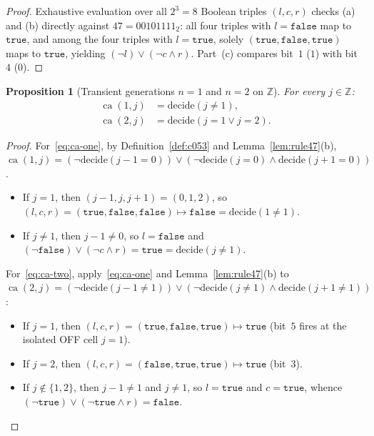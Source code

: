 \documentclass[11pt]{article}
\newtheorem{proposition}[theorem]{Proposition}
\theoremstyle{definition}
\newcommand{\Z}{\mathbb{Z}}
\newcommand{\ca}{\operatorname{ca}}
\begin{document}
\begin{proof}
Exhaustive evaluation over all $2^3 = 8$ Boolean triples $(l, c, r)$ checks (a) and (b) directly against $47 = 00101111_2$: all four triples with $l = \mathtt{false}$ map to $\mathtt{true}$, and among the four triples with $l = \mathtt{true}$, solely $(\mathtt{true}, \mathtt{false}, \mathtt{true})$ maps to $\mathtt{true}$, yielding $(\neg l) \lor (\neg c \land r)$. Part~(c) compares bit~$1$ ($1$) with bit~$4$ ($0$).
\end{proof}

\begin{proposition}[Transient generations $n = 1$ and $n = 2$ on $\Z$]
\label{prop:ca-one-two}
For every $j \in \Z$:
\begin{align}
\ca(1, j) &= \mathrm{decide}(j \ne 1), \label{eq:ca-one}\\
\ca(2, j) &= \mathrm{decide}(j = 1 \lor j = 2). \label{eq:ca-two}
\end{align}
\end{proposition}

\begin{proof}
For~\eqref{eq:ca-one}, by Definition~\ref{def:c053} and Lemma~\ref{lem:rule47}(b), $\ca(1, j) = (\neg \mathrm{decide}(j - 1 = 0)) \lor (\neg \mathrm{decide}(j = 0) \land \mathrm{decide}(j + 1 = 0))$.
\begin{itemize}
\item If $j = 1$, then $(j - 1, j, j + 1) = (0, 1, 2)$, so $(l, c, r) = (\mathtt{true}, \mathtt{false}, \mathtt{false}) \mapsto \mathtt{false} = \mathrm{decide}(1 \ne 1)$.
\item If $j \ne 1$, then $j - 1 \ne 0$, so $l = \mathtt{false}$ and $(\neg \mathtt{false}) \lor (\neg c \land r) = \mathtt{true} = \mathrm{decide}(j \ne 1)$.
\end{itemize}

For~\eqref{eq:ca-two}, apply~\eqref{eq:ca-one} and Lemma~\ref{lem:rule47}(b) to $\ca(2, j) = (\neg \mathrm{decide}(j - 1 \ne 1)) \lor (\neg \mathrm{decide}(j \ne 1) \land \mathrm{decide}(j + 1 \ne 1))$:
\begin{itemize}
\item If $j = 1$, then $(l, c, r) = (\mathtt{true}, \mathtt{false}, \mathtt{true}) \mapsto \mathtt{true}$ (bit~$5$ fires at the isolated OFF cell $j = 1$).
\item If $j = 2$, then $(l, c, r) = (\mathtt{false}, \mathtt{true}, \mathtt{true}) \mapsto \mathtt{true}$ (bit~$3$).
\item If $j \notin \{1, 2\}$, then $j - 1 \ne 1$ and $j \ne 1$, so $l = \mathtt{true}$ and $c = \mathtt{true}$, whence $(\neg \mathtt{true}) \lor (\neg \mathtt{true} \land r) = \mathtt{false}$. \qedhere
\end{itemize}
\end{proof}
\end{document}

